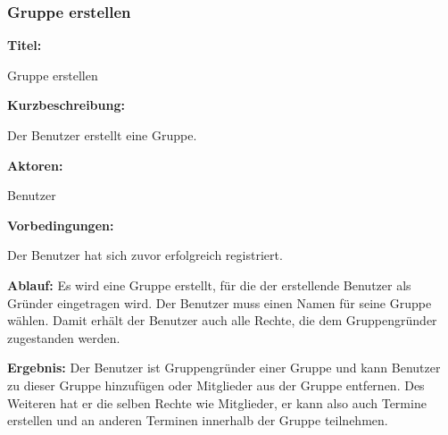 \documentclass{scrartcl}
\begin{document}
	\newpage
	
	\subsubsection{Gruppe erstellen}
	\begin{description}
		\item \textbf{Titel:}
		\begin{description}
			\item Gruppe erstellen
		\end{description}
		\item \textbf{Kurzbeschreibung:}
		\begin{description}
			\item Der Benutzer erstellt eine Gruppe.
		\end{description}
		\item \textbf{Aktoren:}
		\begin{description}
			\item Benutzer 
		\end{description}
		\item \textbf{Vorbedingungen:}
		\begin{description}
			\item Der Benutzer hat sich zuvor erfolgreich registriert.
		\end{description}
		\item \textbf{Ablauf:} \newline Es wird eine Gruppe erstellt, für die der erstellende Benutzer als Gründer eingetragen wird. Der Benutzer muss einen Namen für seine Gruppe wählen. Damit erhält der Benutzer auch alle Rechte, die dem Gruppengründer zugestanden werden. 
		\item \textbf{Ergebnis:} \newline Der Benutzer ist Gruppengründer einer Gruppe und kann Benutzer zu dieser Gruppe hinzufügen oder Mitglieder aus der Gruppe entfernen. Des Weiteren hat er die selben Rechte wie Mitglieder, er kann also auch Termine erstellen und an anderen Terminen innerhalb der Gruppe teilnehmen.
	\end{description}
	
	\newpage
	
\end{document}
